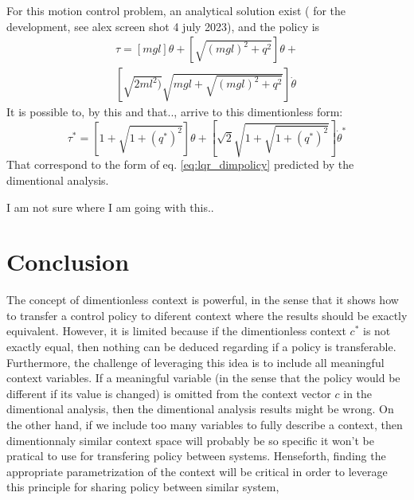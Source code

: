 For this motion control problem, an analytical solution exist ( for the development, see alex screen shot 4 july 2023), and the policy is
\begin{align}
\tau = 
\left[
mgl \right] \theta
+
\left[
\sqrt{ (mgl)^2 + q^2} \right] \theta
+\\
\left[
\sqrt{ 2 ml^2)} \sqrt{mgl+ \sqrt{ (mgl)^2 + q^2}}
\right] \dot{\theta}
\end{align}
It is possible to, by this and that.., arrive to this dimentionless form:
\begin{equation}
\tau^* = 
\left[
1 + \sqrt{ 1 + (q^*)^2}
\right] \theta
+
\left[
\sqrt{2} \sqrt{ 1 + \sqrt{ 1 + (q^*)^2}}
\right] \dot{\theta}^*
\end{equation}
That correspond to the form of eq. \eqref{eq:lqr_dimpolicy} predicted by the dimentional analysis.

I am not sure where I am going with this..


\newpage
\section{Conclusion}


The concept of dimentionless context is powerful, in the sense that it shows how to transfer a control policy to diferent context where the results should be exactly equivalent. However, it is limited because if the dimentionless context $c^*$ is not exactly equal, then nothing can be deduced regarding if a policy is transferable. Furthermore, the challenge of leveraging this idea is to include all meaningful context variables. If a meaningful variable (in the sense that the policy would be different if its value is changed) is omitted from the context vector $c$ in the dimentional analysis, then the dimentional analysis results might be wrong. On the other hand, if we include too many variables to fully describe a context, then dimentionnaly similar context space will probably be so specific it won't be pratical to use for transfering policy between systems. Henseforth, finding the appropriate parametrization of the context will be critical in order to leverage this principle for sharing policy between similar system, 
